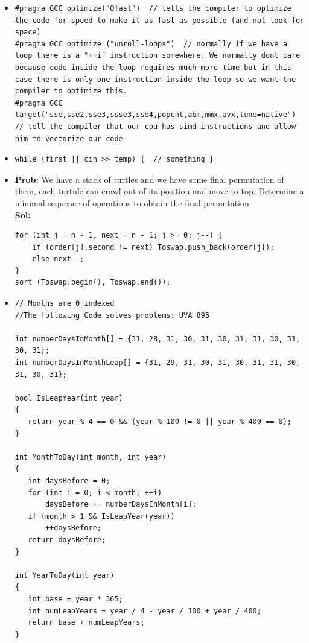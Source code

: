 \documentclass[8pt, a4paper, oneside, twocolumn]{extarticle}
\begin{document}
\begin{itemize}
    \item \begin{verbatim}
#pragma GCC optimize("Ofast")  // tells the compiler to optimize the code for speed to make it as fast as possible (and not look for space)
#pragma GCC optimize ("unroll-loops")  // normally if we have a loop there is a "++i" instruction somewhere. We normally dont care because code inside the loop requires much more time but in this case there is only one instruction inside the loop so we want the compiler to optimize this.
#pragma GCC target("sse,sse2,sse3,ssse3,sse4,popcnt,abm,mmx,avx,tune=native")  // tell the compiler that our cpu has simd instructions and allow him to vectorize our code
\end{verbatim}
    \item \begin{verbatim}
while (first || cin >> temp) {  // something }
            \end{verbatim}
    \item \textbf{Prob: }We have a stack of turtles and we have some final permutation of them, each turtule can crawl out of its position and move to top. Determine a minimal sequence of operations to obtain the final permutation.\\\textbf{Sol: }
    \begin{verbatim}
for (int j = n - 1, next = n - 1; j >= 0; j--) {
    if (order[j].second != next) Toswap.push_back(order[j]);
    else next--;
}
sort (Toswap.begin(), Toswap.end());
\end{verbatim}
    \item \begin{verbatim}
// Months are 0 indexed
//The following Code solves problems: UVA 893 

int numberDaysInMonth[] = {31, 28, 31, 30, 31, 30, 31, 31, 30, 31, 30, 31};
int numberDaysInMonthLeap[] = {31, 29, 31, 30, 31, 30, 31, 31, 30, 31, 30, 31};

bool IsLeapYear(int year)
{
   return year % 4 == 0 && (year % 100 != 0 || year % 400 == 0);
}

int MonthToDay(int month, int year)
{
   int daysBefore = 0;
   for (int i = 0; i < month; ++i)
       daysBefore += numberDaysInMonth[i];
   if (month > 1 && IsLeapYear(year))
       ++daysBefore;
   return daysBefore;
}

int YearToDay(int year)
{
   int base = year * 365;
   int numLeapYears = year / 4 - year / 100 + year / 400;
   return base + numLeapYears;
}


\end{verbatim}
\end{itemize}
\end{document}
